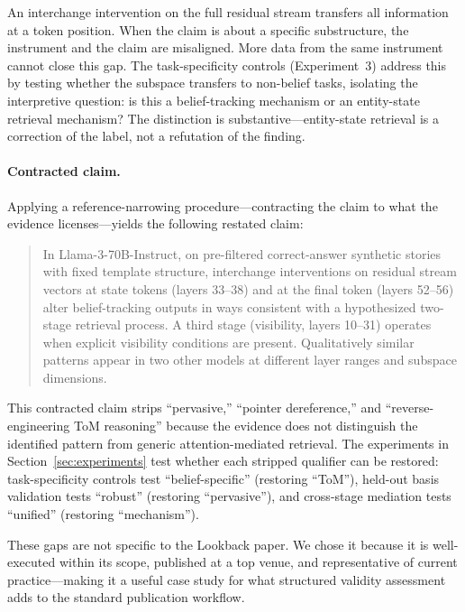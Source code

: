 \documentclass[11pt]{article}
\begin{document}
An interchange intervention on the full residual stream transfers all information at a token position. When the claim is about a specific substructure, the instrument and the claim are misaligned. More data from the same instrument cannot close this gap. The task-specificity controls (Experiment~3) address this by testing whether the subspace transfers to non-belief tasks, isolating the interpretive question: is this a belief-tracking mechanism or an entity-state retrieval mechanism? The distinction is substantive---entity-state retrieval is a correction of the label, not a refutation of the finding.

\paragraph{Contracted claim.}
Applying a reference-narrowing procedure---contracting the claim to what the evidence licenses---yields the following restated claim:

\begin{quote}
In Llama-3-70B-Instruct, on pre-filtered correct-answer synthetic stories with fixed template structure, interchange interventions on residual stream vectors at state tokens (layers 33--38) and at the final token (layers 52--56) alter belief-tracking outputs in ways consistent with a hypothesized two-stage retrieval process. A third stage (visibility, layers 10--31) operates when explicit visibility conditions are present. Qualitatively similar patterns appear in two other models at different layer ranges and subspace dimensions.
\end{quote}

This contracted claim strips ``pervasive,'' ``pointer dereference,'' and ``reverse-engineering ToM reasoning'' because the evidence does not distinguish the identified pattern from generic attention-mediated retrieval. The experiments in Section~\ref{sec:experiments} test whether each stripped qualifier can be restored: task-specificity controls test ``belief-specific'' (restoring ``ToM''), held-out basis validation tests ``robust'' (restoring ``pervasive''), and cross-stage mediation tests ``unified'' (restoring ``mechanism'').

These gaps are not specific to the Lookback paper. We chose it because it is well-executed within its scope, published at a top venue, and representative of current practice---making it a useful case study for what structured validity assessment adds to the standard publication workflow.
\end{document}
